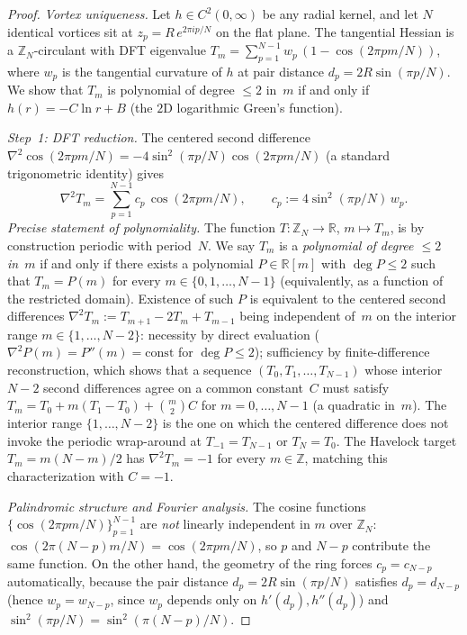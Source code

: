 \begin{proof}
\emph{Vortex uniqueness.}
Let $h \in C^2(0,\infty)$ be any radial kernel, and let
$N$ identical vortices sit at $z_p = R\,e^{2\pi ip/N}$
on the flat plane.
The tangential Hessian is a $\mathbb{Z}_N$-circulant
with DFT eigenvalue
$T_m = \sum_{p=1}^{N-1} w_p\,(1 - \cos(2\pi pm/N))$,
where $w_p$ is the tangential curvature of $h$ at
pair distance $d_p = 2R\sin(\pi p/N)$.
We show that $T_m$ is polynomial of degree $\le 2$
in~$m$ if and only if $h(r) = -C\ln r + B$
(the $2$D logarithmic Green's function).

\emph{Step~1: DFT reduction.}
The centered second difference
$\nabla^2\cos(2\pi pm/N) = -4\sin^2(\pi p/N)\cos(2\pi pm/N)$
(a standard trigonometric identity) gives
\begin{equation}\label{eq:delta2-Salpha}
  \nabla^2 T_m
  = \sum_{p=1}^{N-1} c_p\,\cos(2\pi pm/N),
  \qquad
  c_p := 4\sin^2(\pi p/N)\,w_p.
\end{equation}
\emph{Precise statement of polynomiality.}
The function $T: \mathbb{Z}_N \to \mathbb{R}$,
$m \mapsto T_m$, is by construction periodic with period~$N$.
We say $T_m$ is a \emph{polynomial of degree $\le 2$
in~$m$} if and only if there exists a polynomial
$P \in \mathbb{R}[m]$ with $\deg P \le 2$ such that
$T_m = P(m)$ for every $m \in \{0, 1, \ldots, N{-}1\}$
(equivalently, as a function of the restricted domain).
Existence of such $P$ is equivalent to the centered
second differences
$\nabla^2 T_m := T_{m+1} - 2 T_m + T_{m-1}$
being independent of~$m$ on the interior range
$m \in \{1, \ldots, N{-}2\}$: necessity by direct evaluation
($\nabla^2 P(m) = P''(m) = \text{const}$ for $\deg P \le 2$);
sufficiency by finite-difference reconstruction, which shows
that a sequence $(T_0, T_1, \ldots, T_{N-1})$ whose interior
$N - 2$ second differences agree on a common constant~$C$
must satisfy $T_m = T_0 + m(T_1 - T_0) + \binom{m}{2} C$ for
$m = 0, \ldots, N{-}1$ (a quadratic in~$m$).
The interior range $\{1, \ldots, N{-}2\}$ is the one on which
the centered difference does not invoke the periodic
wrap-around at $T_{-1} = T_{N-1}$ or $T_N = T_0$.
The Havelock target $T_m = m(N-m)/2$ has
$\nabla^2 T_m = -1$ for every $m \in \mathbb{Z}$, matching
this characterization with $C = -1$.

\emph{Palindromic structure and Fourier analysis.}
The cosine functions $\{\cos(2\pi pm/N)\}_{p=1}^{N-1}$
are \emph{not} linearly independent in $m$ over
$\mathbb{Z}_N$: $\cos(2\pi(N{-}p)m/N) = \cos(2\pi pm/N)$,
so $p$ and $N{-}p$ contribute the same function.
On the other hand, the geometry of the ring forces
$c_p = c_{N-p}$ automatically, because the pair
distance $d_p = 2R\sin(\pi p/N)$ satisfies $d_p = d_{N-p}$
(hence $w_p = w_{N-p}$, since $w_p$ depends only on
$h'(d_p), h''(d_p)$) and
$\sin^2(\pi p/N) = \sin^2(\pi(N{-}p)/N)$.


\end{proof}
